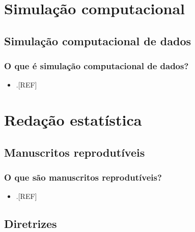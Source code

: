 \documentclass[
]{book}
\providecommand{\tightlist}{%
  \setlength{\itemsep}{0pt}\setlength{\parskip}{0pt}}
\begin{document}
\hypertarget{simulacao-computacional}{%
\chapter{\texorpdfstring{\textbf{Simulação computacional}}{Simulação computacional}}\label{simulacao-computacional}}

\hypertarget{simulacao-computacional-dados}{%
\section{Simulação computacional de dados}\label{simulacao-computacional-dados}}

\hypertarget{o-que-uxe9-simulauxe7uxe3o-computacional-de-dados}{%
\subsection{O que é simulação computacional de dados?}\label{o-que-uxe9-simulauxe7uxe3o-computacional-de-dados}}

\begin{itemize}
\tightlist
\item
  .{[}REF{]}
\end{itemize}

\hypertarget{redacao}{%
\chapter{\texorpdfstring{\textbf{Redação estatística}}{Redação estatística}}\label{redacao}}

\hypertarget{manuscritos-reprodutiveis}{%
\section{Manuscritos reprodutíveis}\label{manuscritos-reprodutiveis}}

\hypertarget{o-que-suxe3o-manuscritos-reprodutuxedveis}{%
\subsection{O que são manuscritos reprodutíveis?}\label{o-que-suxe3o-manuscritos-reprodutuxedveis}}

\begin{itemize}
\tightlist
\item
  .{[}REF{]}
\end{itemize}

\hypertarget{diretrizes}{%
\section{Diretrizes}\label{diretrizes}}
\end{document}
